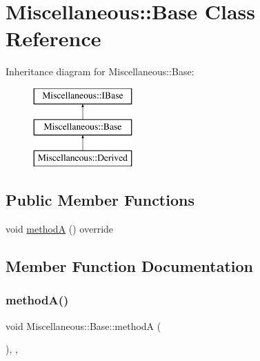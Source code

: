 \hypertarget{classMiscellaneous_1_1Base}{}\section{Miscellaneous\+::Base Class Reference}
\label{classMiscellaneous_1_1Base}
Inheritance diagram for Miscellaneous\+::Base\+:\begin{figure}[H]
\begin{center}
\leavevmode
\includegraphics[height=3.000000cm]{classMiscellaneous_1_1Base}
\end{center}
\end{figure}
\subsection*{Public Member Functions}
\begin{DoxyCompactItemize}
\item 
void \mbox{\hyperlink{classMiscellaneous_1_1Base_a232b441e93771353e2a61dd083066e69}{methodA}} () override
\end{DoxyCompactItemize}


\subsection{Member Function Documentation}
\mbox{\label{classMiscellaneous_1_1Base_a232b441e93771353e2a61dd083066e69}} 
\subsubsection{\texorpdfstring{methodA()}{methodA()}}
{\footnotesize\ttfamily void Miscellaneous\+::\+Base\+::methodA (\begin{DoxyParamCaption}{ }\end{DoxyParamCaption})\hspace{0.3cm}{\ttfamily [inline]}, {\ttfamily [override]}, {\ttfamily [virtual]}}



